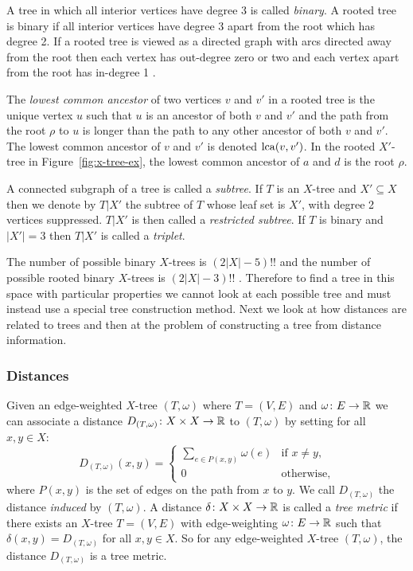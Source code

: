 A tree in which all interior vertices have degree 3 is called \textit{binary}.
A rooted tree is binary if all interior vertices have degree 3 apart from the
root which has degree 2.  If a rooted tree is viewed as a directed graph with
arcs directed away from the root then each vertex has out-degree zero or two
and each vertex apart from the root has in-degree 1
\cite{semple2003phylogenetics}.

The \textit{lowest common ancestor} of two vertices $v$ and $v'$ in a rooted
tree is the unique vertex $u$ such that $u$ is an ancestor of both $v$ and
$v'$ and the path from the root $\rho$ to $u$ is longer than the path to any
other ancestor of both $v$ and $v'$.  The lowest common ancestor of $v$ and
$v'$ is denoted $\operatorname{lca}(v,v')$.  In the rooted $X'$-tree in
Figure~\ref{fig:x-tree-ex}, the lowest common ancestor of $a$ and $d$ is the
root $\rho$.

A connected subgraph of a tree is called a \textit{subtree}.  If $T$ is an
$X$-tree and $X' \subseteq X$ then we denote by $T|X'$ the subtree of $T$
whose leaf set is $X'$, with degree 2 vertices suppressed.  $T|X'$ is then
called a \textit{restricted subtree}.  If $T$ is binary and $|X'| = 3$ then
$T|X'$ is called a \textit{triplet}.

The number of possible binary $X$-trees is $(2|X|-5)!!$ and the number of
possible rooted binary $X$-trees is $(2|X|-3)!!$
\cite{felsenstein2004inferring}.  Therefore to find a tree in this space with
particular properties we cannot look at each possible tree and must instead
use a special tree construction method.  Next we look at how distances are
related to trees and then at the problem of constructing a tree from distance
information.

\subsubsection{Distances}
\label{sec:distances}

Given an edge-weighted $X$-tree $(T,\omega)$ where $T=(V,E)$ and $\omega
\colon E \to {\mathbb R}$ we can associate a distance $D_{(T,\omega)} \colon X \times
X \to {\mathbb R}$ to $(T,\omega)$ by setting for all $x,y \in X$:
\begin{equation*}
  D_{(T,\omega)}(x,y) =
  \begin{cases}
    \displaystyle
    \sum_{e \in P(x,y)} \omega(e) & \text{if $x \neq y$},\\
    0 & \text{otherwise,}
  \end{cases}
\end{equation*}
where $P(x,y)$ is the set of edges on the path from $x$ to $y$.  We call
$D_{(T,\omega)}$ the distance \textit{induced} by $(T,\omega)$.  A distance
$\delta \colon X \times X \to {\mathbb R}$ is called a \textit{tree metric} if there
exists an $X$-tree $T=(V,E)$ with edge-weighting $\omega \colon E \to {\mathbb R}$
such that $\delta(x,y) = D_{(T,\omega)}$ for all $x,y \in X$.  So for any
edge-weighted $X$-tree $(T,\omega)$, the distance $D_{(T,\omega)}$ is a tree
metric.

